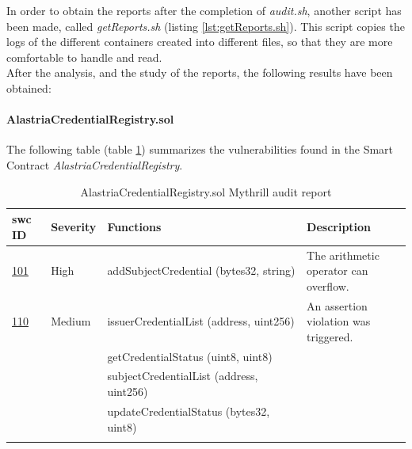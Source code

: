 

In order to obtain the reports after the completion of \textit{audit.sh}, another script has been made, called \textit{getReports.sh} (listing \ref{lst:getReports.sh}). This script copies the logs of the different containers created into different files, so that they are more comfortable to handle and read.\\



After the analysis, and the study of the reports, the following results have been obtained:
\paragraph{AlastriaCredentialRegistry.sol}
The following table (table \ref{tab:AlastriaCredentialRegistry}) summarizes the vulnerabilities found in the Smart Contract \textit{AlastriaCredentialRegistry}.
\begin{longtable}{||p{0.1\linewidth} | p{0.11\linewidth} | p{0.52\linewidth} | p{0.3\linewidth}||}
    \hline
    \textbf{\acrshort{swc} ID}                      & \textbf{Severity} & \textbf{Functions}                       & \textbf{Description}                  \\ [0.5ex]
    \hline\hline
    \href{https://swcregistry.io/docs/SWC-101}{101} & High              & addSubjectCredential (bytes32, string)   & The arithmetic operator can overflow. \\
    \hline
    \href{https://swcregistry.io/docs/SWC-110}{110} & Medium            & issuerCredentialList (address, uint256)  & An assertion violation was triggered. \\
    \cline{3-3}
                                                    &                   & getCredentialStatus (uint8, uint8)       &                                       \\
    \cline{3-3}
                                                    &                   & subjectCredentialList (address, uint256) &                                       \\
    \cline{3-3}
                                                    &                   & updateCredentialStatus (bytes32, uint8)  &                                       \\ [1ex]
    \hline
    \caption{AlastriaCredentialRegistry.sol Mythrill audit report}
    \label{tab:AlastriaCredentialRegistry}
\end{longtable}

